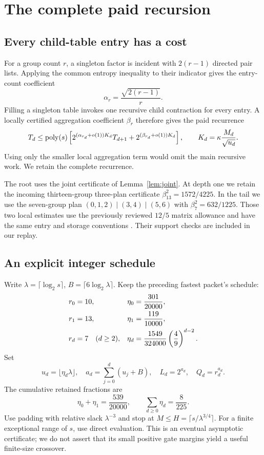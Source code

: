 \section{The complete paid recursion}
\label{sec:recursion}

\subsection{Every child-table entry has a cost}

For a group count $r$, a singleton factor is incident with $2(r-1)$
directed pair lists. Applying the common entropy inequality to their
indicator gives the entry-count coefficient
\[
 \alpha_r=\frac{\sqrt{2(r-1)}}r.
\]
Filling a singleton table invokes one recursive child contraction for
every entry. A locally certified aggregation coefficient $\beta_r$
therefore gives the paid recurrence
\begin{equation}\label{eq:paid-recurrence}
 T_d\le\operatorname{poly}(s)\left[
       2^{(\alpha_{r_d}+o(1))K_d}T_{d+1}
       +2^{(\beta_{r_d}+o(1))K_d}\right],
 \qquad K_d=\kappa\frac{M_d}{\sqrt{u_d}}.
\end{equation}
Using only the smaller local aggregation term would omit the main
recursive work. We retain the complete recurrence.

The root uses the joint certificate of Lemma~\ref{lem:joint}.
At depth one we retain the incoming thirteen-group three-plan certificate
$\beta_{13}^2=1572/4225$. In the tail we use the seven-group plan
$(0,1,2)\mid(3,4)\mid(5,6)$ with $\beta_7^2=632/1225$.
Those two local estimates use the previously reviewed $12/5$ matrix
allowance and have the same entry and storage conventions
\cite{trees,pairwise}. Their support checks are included in our replay.

\subsection{An explicit integer schedule}

Write $\lambda=\lceil\log_2s\rceil$, $B=\lceil6\log_2\lambda\rceil$.
Keep the preceding fastest packet's schedule:
\begin{align}\label{eq:schedule}
 r_0&=10,& \eta_0&=\frac{301}{20000},\notag\\
 r_1&=13,& \eta_1&=\frac{119}{10000},\notag\\
 r_d&=7\quad(d\ge2),&
 \eta_d&=\frac{1549}{324000}\left(\frac49\right)^{d-2}.
\end{align}
Set
\[
 u_d=\lfloor\eta_d\lambda\rfloor,\quad
 a_d=\sum_{j=0}^d(u_j+B),\quad L_d=2^{a_d},\quad Q_d=r_d^{a_d}.
\]
The cumulative retained fractions are
\[
 \eta_0+\eta_1=\frac{539}{20000},\qquad
 \sum_{d\ge0}\eta_d=\frac8{225}.
\]
Use padding with relative slack $\lambda^{-3}$ and stop at
$M\le H=\lceil s/\lambda^{3/4}\rceil$. For a finite exceptional range
of $s$, use direct evaluation. This is an eventual asymptotic certificate;
we do not assert that its small positive gate margins yield a useful
finite-size crossover.

